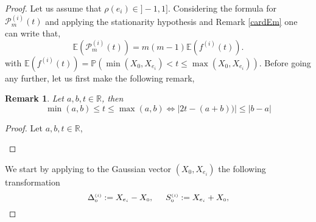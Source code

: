 \documentclass[12pt]{article}
\theoremstyle{Theorem}
\newtheorem{remark}{Remark}
\begin{document}
\begin{proof}
Let us assume that $\rho(e_{i}) \in ]-1,1]$. Considering the formula for $\mathcal{P}^{\scriptscriptstyle  (i)}_{m}(t)$ and applying the stationarity hypothesis and Remark \ref{cardEm} one can write that, 
\begin{equation*}
\mathbb{E}\left(\mathcal{P}^{\scriptscriptstyle  (i)}_{m}(t) \right) = m(m-1)\mathbb{E}\left(f^{(i)}(t)\right).
\label{covarianeproof}
\end{equation*}
 with $\mathbb{E}\left(f^{(i)}(t)\right) = \mathbb{P}\left(\min\left(X_{\scriptscriptstyle 0}, X_{e_i}\right) < t \leq \max\left(X_{\scriptscriptstyle 0}, X_{e_i}\right)\right)$. Before going any further, let us first make the following remark, 
 \begin{remark}
\label{lemmasommediff}
Let $a,b,t \in \mathbb{R}$, then 
$$\min(a,b) \leq t \leq \max(a,b) \iff\left|2t - (a+b))\right| \leq \left| b-a \right| $$
\end{remark}
\begin{proof}
Let $a,b,t \in \mathbb{R}$,
\begin{figure}[H]
\centering
{}
\end{figure}
\end{proof}
We start by applying to the Gaussian vector $\left(X_{\scriptscriptstyle 0}, X_{e_i}\right)$ the following transformation \begin{equation*} \label{expressions} \Delta^{\scriptscriptstyle (i)}_{\scriptscriptstyle 0} := X_{e_i} - X_{\scriptscriptstyle 0}, \hspace{0.5cm} S^{\scriptscriptstyle (i)}_{\scriptscriptstyle 0} := X_{e_i} + X_{\scriptscriptstyle 0}, \end{equation*} 

\end{proof}
\end{document}
